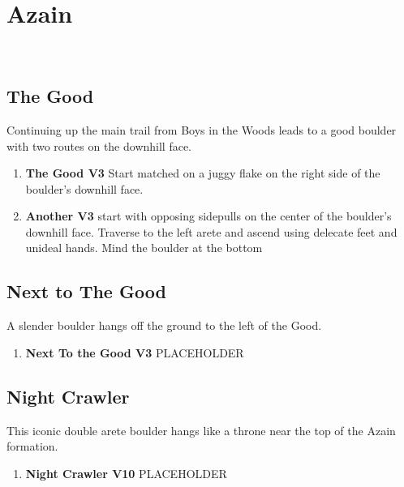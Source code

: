 \section{Azain}\label{sa:Azain}
\

\subsection*{The Good}\label{bf:The Good}
Continuing up the main trail from Boys in the Woods leads to a good boulder with two routes on the downhill face.

\begin{enumerate}[]
	\item\label{rt:The Good} \colorbox{green!20}{\textbf{The Good V3     } }
	\newline Start matched on a juggy flake on the right side of the boulder's downhill face.\
	\item\label{rt:Another} \colorbox{green!20}{\textbf{Another V3    \warn } }
	\newline start with opposing sidepulls on the center of the boulder's downhill face. Traverse to the left arete and ascend using delecate feet and unideal hands. Mind the boulder at the bottom\
\end{enumerate}
\subsection*{Next to The Good}\label{bf:Next to The Good}
A slender boulder hangs off the ground to the left of the Good.

\begin{enumerate}[resume]
	\item\label{rt:Next To the Good} \colorbox{green!20}{\textbf{Next To the Good V3  \warn } }
	\newline PLACEHOLDER\
\end{enumerate}
\subsection*{Night Crawler}\label{bf:Night Crawler}
This iconic double arete boulder hangs like a throne near the top of the Azain formation.

\begin{enumerate}[resume]
	\item\label{rt:Night Crawler} \colorbox{red!20}{\textbf{Night Crawler V10  } }
	\newline PLACEHOLDER\
\end{enumerate}
